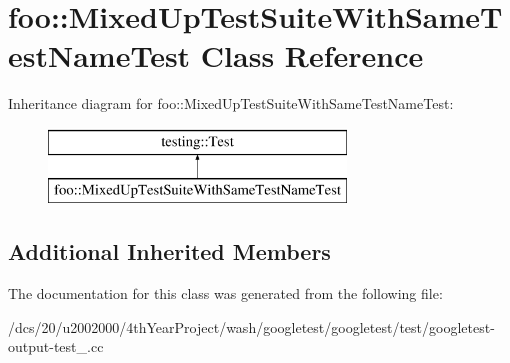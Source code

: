 \hypertarget{classfoo_1_1MixedUpTestSuiteWithSameTestNameTest}{}\section{foo\+:\+:Mixed\+Up\+Test\+Suite\+With\+Same\+Test\+Name\+Test Class Reference}
\label{classfoo_1_1MixedUpTestSuiteWithSameTestNameTest}
Inheritance diagram for foo\+:\+:Mixed\+Up\+Test\+Suite\+With\+Same\+Test\+Name\+Test\+:\begin{figure}[H]
\begin{center}
\leavevmode
\includegraphics[height=2.000000cm]{classfoo_1_1MixedUpTestSuiteWithSameTestNameTest}
\end{center}
\end{figure}
\subsection*{Additional Inherited Members}


The documentation for this class was generated from the following file\+:\begin{DoxyCompactItemize}
\item 
/dcs/20/u2002000/4th\+Year\+Project/wash/googletest/googletest/test/googletest-\/output-\/test\+\_\+.\+cc\end{DoxyCompactItemize}
